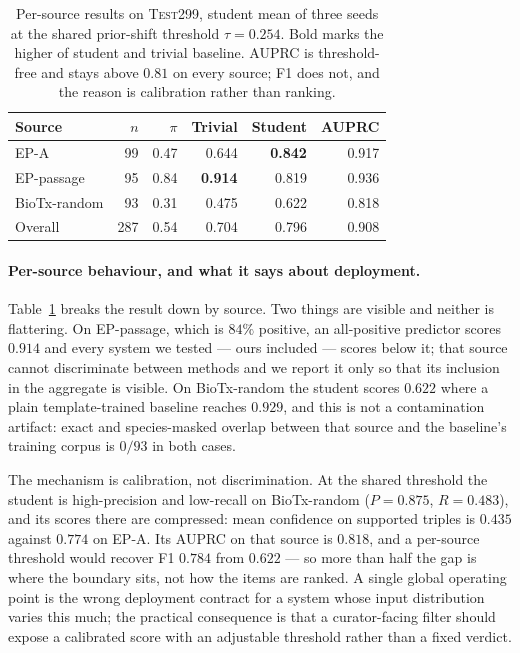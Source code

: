 \documentclass[11pt]{article}
\begin{document}
\begin{table}[t]\centering\small
\begin{tabular}{lrrrrr}
\toprule
Source & $n$ & $\pi$ & Trivial & Student & AUPRC \\
\midrule
EP-A                  & 99 & 0.47 & 0.644 & \textbf{0.842} & 0.917 \\
EP-passage            & 95 & 0.84 & \textbf{0.914} & 0.819 & 0.936 \\
BioTx-random          & 93 & 0.31 & 0.475 & 0.622 & 0.818 \\
\midrule
Overall               & 287 & 0.54 & 0.704 & 0.796 & 0.908 \\
\bottomrule
\end{tabular}
\caption{Per-source results on \textsc{Test299}, student mean of three seeds at the shared
prior-shift threshold $\tau = 0.254$. Bold marks the higher of student and trivial baseline. AUPRC
is threshold-free and stays above $0.81$ on every source; F1 does not, and the reason is
calibration rather than ranking.}
\label{tab:persource}
\end{table}

\paragraph{Per-source behaviour, and what it says about deployment.}
Table~\ref{tab:persource} breaks the result down by source. Two things are visible and neither is
flattering. On EP-passage, which is $84\%$ positive, an all-positive predictor scores $0.914$ and
every system we tested --- ours included --- scores below it; that source cannot discriminate
between methods and we report it only so that its inclusion in the aggregate is visible. On
BioTx-random the student scores $0.622$ where a plain template-trained baseline reaches $0.929$,
and this is not a contamination artifact: exact and species-masked overlap between that source and
the baseline's training corpus is $0/93$ in both cases.

The mechanism is calibration, not discrimination. At the shared threshold the student is
high-precision and low-recall on BioTx-random ($P = 0.875$, $R = 0.483$), and its scores there are
compressed: mean confidence on supported triples is $0.435$ against $0.774$ on EP-A. Its AUPRC on
that source is $0.818$, and a per-source threshold would recover F1 $0.784$ from $0.622$ --- so
more than half the gap is where the boundary sits, not how the items are ranked. A single global
operating point is the wrong deployment contract for a system whose input distribution varies this
much; the practical consequence is that a curator-facing filter should expose a calibrated score
with an adjustable threshold rather than a fixed verdict.
\end{document}
